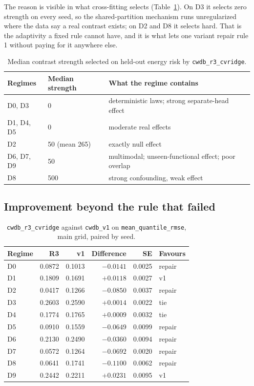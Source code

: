 \documentclass[11pt,a4paper]{article}
\theoremstyle{definition}
\theoremstyle{remark}
\begin{document}
The reason is visible in what cross-fitting selects (Table~\ref{tab:selected}).
On D3 it selects zero strength on every seed, so the shared-partition mechanism
runs unregularized where the data say a real contrast exists; on D2 and D8 it
selects hard. That is the adaptivity a fixed rule cannot have, and it is what
lets one variant repair rule 1 without paying for it anywhere else.

\begin{table}[htbp]
\centering
\caption{Median contrast strength selected on held-out energy risk by
\texttt{cwdb\_r3\_cvridge}.}
\label{tab:selected}
\small
\begin{tabular}{@{}llp{7.2cm}@{}}
\toprule
Regimes & Median strength & What the regime contains \\
\midrule
D0, D3 & 0 & deterministic laws; strong separate-head effect \\
D1, D4, D5 & 0 & moderate real effects \\
D2 & 50 (mean 265) & exactly null effect \\
D6, D7, D9 & 50 & multimodal; unseen-functional effect; poor overlap \\
D8 & 500 & strong confounding, weak effect \\
\bottomrule
\end{tabular}
\end{table}

\subsection{Improvement beyond the rule that failed}

\begin{table}[htbp]
\centering
\caption{\texttt{cwdb\_r3\_cvridge} against \texttt{cwdb\_v1} on
\texttt{mean\_quantile\_rmse}, main grid, paired by seed.}
\label{tab:r3vs}
\small
\begin{tabular}{@{}lrrrrl@{}}
\toprule
Regime & R3 & v1 & Difference & SE & Favours \\
\midrule
D0 & 0.0872 & 0.1013 & $-0.0141$ & 0.0025 & repair \\
D1 & 0.1809 & 0.1691 & $+0.0118$ & 0.0027 & v1 \\
D2 & 0.0417 & 0.1266 & $-0.0850$ & 0.0037 & repair \\
D3 & 0.2603 & 0.2590 & $+0.0014$ & 0.0022 & tie \\
D4 & 0.1774 & 0.1765 & $+0.0009$ & 0.0032 & tie \\
D5 & 0.0910 & 0.1559 & $-0.0649$ & 0.0099 & repair \\
D6 & 0.2130 & 0.2490 & $-0.0360$ & 0.0094 & repair \\
D7 & 0.0572 & 0.1264 & $-0.0692$ & 0.0020 & repair \\
D8 & 0.0641 & 0.1741 & $-0.1100$ & 0.0062 & repair \\
D9 & 0.2442 & 0.2211 & $+0.0231$ & 0.0095 & v1 \\
\bottomrule
\end{tabular}
\end{table}
\end{document}
